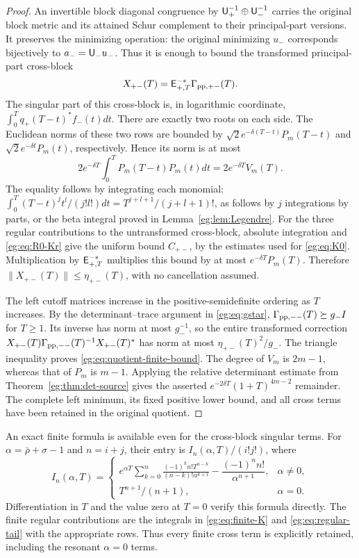 \begin{proof}
An invertible block diagonal congruence by
$\mathsf U_+^{-1}\oplus\mathsf U_-^{-1}$ carries the original block metric and
its attained Schur complement to their principal-part versions.
It preserves the minimizing operation: the original minimizing
$u_-$ corresponds bijectively to $a_-=\mathsf U_-u_-$. Thus it is enough
to bound the transformed principal-part cross-block
\[
 X_{+-}(T)=\mathsf E_{+,T}^{-*}\Gamma_{{\rm pp},+-}(T).
\]
The singular part of this cross-block is, in logarithmic coordinate,
$\int_0^Tq_+(T-t)^*f_-(t)dt$. There are exactly two roots on
each side. The Euclidean norms of these two rows are bounded by
$\sqrt2e^{-\delta(T-t)}P_m(T-t)$ and
$\sqrt2e^{-\delta t}P_m(t)$, respectively. Hence its norm is at most
\[
 2e^{-\delta T}\int_0^TP_m(T-t)P_m(t)dt
                       =2e^{-\delta T}V_m(T).
\]
The equality follows by integrating each monomial:
$\int_0^T(T-t)^jt^l/(j!l!)dt=T^{j+l+1}/(j+l+1)!$,
as follows by $j$ integrations by parts, or the beta integral
proved in Lemma~\ref{eg:lem:Legendre}.
For the three regular contributions to the untransformed
cross-block, absolute integration and \eqref{eg:eq:R0-Kr} give the
uniform bound $C_{+-}$, by the estimates used for
\eqref{eg:eq:K0}. Multiplication by $\mathsf E_{+,T}^{-*}$ multiplies this
bound by at most $e^{-\delta T}P_m(T)$. Therefore
$\|X_{+-}(T)\|\le\eta_{+-}(T)$, with no cancellation assumed.

The left cutoff matrices increase in the positive-semidefinite
ordering as $T$ increases. By the determinant--trace argument in
\eqref{eg:eq:gstar}, $\Gamma_{\rm pp,--}(T)\succeq g_-I$ for
$T\ge1$. Its inverse has norm at most $g_-^{-1}$, so the entire
transformed correction $X_{+-}(T)\Gamma_{\rm pp,--}(T)^{-1}
X_{+-}(T)^*$ has norm at most $\eta_{+-}(T)^2/g_-$.
The triangle inequality proves \eqref{eg:eq:quotient-finite-bound}.
The degree of $V_m$ is $2m-1$, whereas that of $P_m$ is $m-1$.
Applying the relative determinant estimate from
Theorem~\ref{eg:thm:det-source} gives the asserted
$e^{-2\delta T}(1+T)^{4m-2}$ remainder. The complete left
minimum, its fixed positive lower bound, and all cross terms have
been retained in the original quotient.
\end{proof}

An exact finite formula is available even for the cross-block singular
terms. For $\alpha=\bar\rho+\sigma-1$ and $n=i+j$, their entry is
$I_n(\alpha,T)/(i!j!)$, where
\[
 I_n(\alpha,T)=
 \begin{cases}
 e^{\alpha T}\displaystyle\sum_{k=0}^n
 \frac{(-1)^k n!T^{n-k}}{(n-k)!\alpha^{k+1}}
                  -\dfrac{(-1)^n n!}{\alpha^{n+1}},&\alpha\ne0,\\[4pt]
 T^{n+1}/(n+1),&\alpha=0.
 \end{cases}\tag{EG41}\label{eg:eq:finite-moment}
\]
Differentiation in $T$ and the value zero at $T=0$ verify this
formula directly. The finite regular contributions are the integrals
in \eqref{eg:eq:finite-K} and \eqref{eg:eq:regular-tail} with the appropriate
rows. Thus every finite cross term is explicitly retained, including
the resonant $\alpha=0$ terms.

